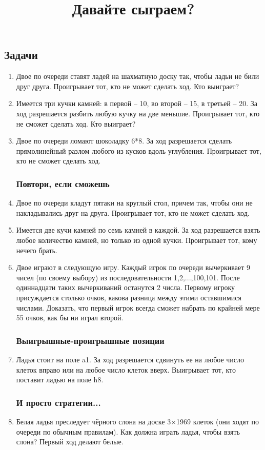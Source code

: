 \documentclass[a4paper,12pt]{article}
\title{Давайте сыграем?}
\date{}
\begin{document}
\maketitle
    \subsection*{Задачи}
    \begin{enumerate}
    \subsubsection*{Задачи-шутки}
    \item Двое по очереди ставят ладей на шахматную доску так, чтобы ладьи не били друг друга. Проигрывает тот, кто не может сделать ход. Кто выиграет?
    \item Имеется три кучки камней: в первой – 10, во второй – 15, в третьей – 20. За ход разрешается разбить любую кучку на две меньшие. Проигрывает тот, кто не сможет сделать ход. Кто выиграет?
    \item Двое по очереди ломают шоколадку 6*8. За ход разрешается сделать прямолинейный разлом любого из кусков вдоль углубления. Проигрывает тот, кто не сможет сделать ход.
    \subsubsection*{Повтори, если сможешь}
    \item Двое по очереди кладут пятаки на круглый стол, причем так, чтобы они не накладывались друг на друга. Проигрывает тот, кто не может сделать ход.
    \item Имеется две кучи камней по семь камней в каждой. За ход разрешается взять любое количество камней, но только из одной кучки. Проигрывает тот, кому нечего брать.
    \item Двое играют в следующую игру. Каждый игрок по очереди вычеркивает 9 чисел (по своему выбору) из последовательности 1,2,...,100,101. После одиннадцати таких вычеркиваний останутся 2 числа. Первому игроку присуждается столько очков, какова разница между этими оставшимися числами. Доказать, что первый игрок всегда сможет набрать по крайней мере 55 очков, как бы ни играл второй.
    \subsubsection*{Выигрышные-проигрышные позиции}
    \item Ладья стоит на поле a1. За ход разрешается сдвинуть ее на любое число клеток вправо или на любое число клеток вверх. Выигрывает тот, кто поставит ладью на поле h8.
    \subsubsection*{И просто стратегии...}
    \item Белая ладья преследует чёрного слона на доске 3×1969 клеток (они ходят по очереди по обычным правилам). Как должна играть ладья, чтобы взять слона? Первый ход делают белые.
        
    \end{enumerate}
\end{document}
